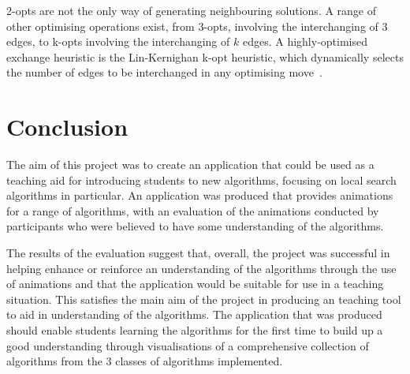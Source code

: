 \documentclass{l4proj}
\begin{document}
2-opts are not the only way of generating neighbouring solutions. A range of other optimising operations exist, from 3-opts, involving the interchanging of 3 edges, to k-opts involving the interchanging of $k$ edges. A highly-optimised exchange heuristic is the Lin-Kernighan k-opt heuristic, which dynamically selects the number of edges to be interchanged in any optimising move~\cite{lkOpt}.

\chapter{Conclusion}
\label{conclusion}
The aim of this project was to create an application that could be used as a teaching aid for introducing students to new algorithms, focusing on local search algorithms in particular. An application was produced that provides animations for a range of algorithms, with an evaluation of the animations conducted by participants who were believed to have some understanding of the algorithms.

The results of the evaluation suggest that, overall, the project was successful in helping enhance or reinforce an understanding of the algorithms through the use of animations and that the application would be suitable for use in a teaching situation. This satisfies the main aim of the project in producing an teaching tool to aid in understanding of the algorithms. The application that was produced should enable students learning the algorithms for the first time to build up a good understanding through visualisations of a comprehensive collection of algorithms from the 3 classes of algorithms implemented.



\end{document}
